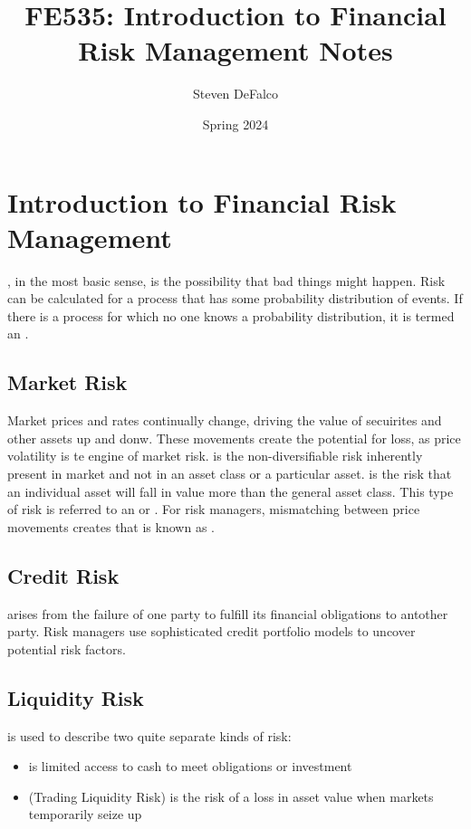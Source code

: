 \documentclass{article}
\title{FE535: Introduction to Financial Risk Management Notes}
\author{Steven DeFalco}
\date{Spring 2024}
\begin{document}
\maketitle
\tableofcontents
\newpage


\section{Introduction to Financial Risk Management}

, in the most basic sense, is the possibility that bad things might happen. Risk can be calculated for a process that has some probability distribution of events. If there is a process for which no one knows a probability distribution, it is termed an . \\ 

\subsection{Market Risk}

Market prices and rates continually change, driving the value of secuirites and other assets up and donw. These movements create the potential for loss, as price volatility is te engine of market risk.  is the non-diversifiable risk inherently present in market and not in an asset class or a particular asset.  is the risk that an individual asset will fall in value more than the general asset class. This type of risk is referred to an  or . For risk managers, mismatching between price movements creates that is known as . 

\subsection{Credit Risk}

 arises from the failure of one party to fulfill its financial obligations to antother party. Risk managers use sophisticated credit portfolio models to uncover potential risk factors. 

\subsection{Liquidity Risk}

 is used to describe two quite separate kinds of risk: 
\begin{itemize}
  \item {} is limited access to cash to meet obligations or investment 
  \item {} (Trading Liquidity Risk) is the risk of a loss in asset value when markets temporarily seize up
\end{itemize}
\end{document}
